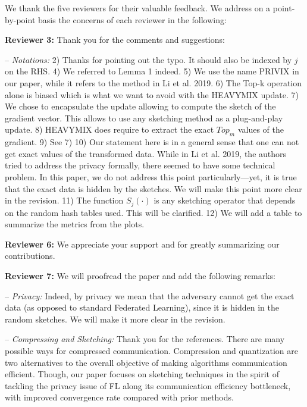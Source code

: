 \documentclass{article}
\begin{document}
We thank the five reviewers for their valuable feedback. 
We address on a point-by-point basis the concerns of each reviewer in the following:


\textbf{Reviewer 3:} Thank you for the comments and suggestions:\vspace{-5pt}

-- \textit{Notations:} 
2) Thanks for pointing out the typo. It should also be indexed by $j$ on the RHS.
4) We referred to Lemma 1 indeed.
5) We use the name PRIVIX in our paper, while it refers to the method in Li et al. 2019.
6) The Top-k operation alone is biased which is what we want to avoid with the HEAVYMIX update.
7) We chose to encapsulate the update allowing to compute the sketch of the gradient vector. This allows to use any sketching method as a plug-and-play update.
8) HEAVYMIX does require to extract the exact $Top_m$ values of the gradient.
9) See 7)
10) Our statement here is in a general sense that one can not get exact values of the transformed data. While in Li et al. 2019, the authors tried to address the privacy formally, there seemed to have some technical problem. In this paper, we do not address this point particularly---yet, it is true that the exact data is hidden by the sketches. We will make this point more clear in the revision.
11) The function $S_j(\cdot)$ is any sketching operator that depends on the random hash tables used. This will be clarified.
12) We will add a table to summarize the metrics from the plots.

\textbf{Reviewer 6:} We appreciate your support and for greatly summarizing our contributions.



\textbf{Reviewer 7:} We will proofread the paper and add the following remarks:

-- \textit{Privacy:} Indeed, by privacy we mean that the adversary cannot get the exact data (as opposed to standard Federated Learning), since it is hidden in the random sketches. We will make it more clear in the revision.

-- \textit{Compressing and Sketching:} Thank you for the references.
There are many possible ways for compressed communication. Compression and quantization are two alternatives to the overall objective of making algorithms communication efficient.
Though, our paper focuses on sketching techniques in the spirit of tackling the privacy issue of FL along its communication efficiency bottleneck, with improved convergence rate compared with prior methods.
\end{document}
